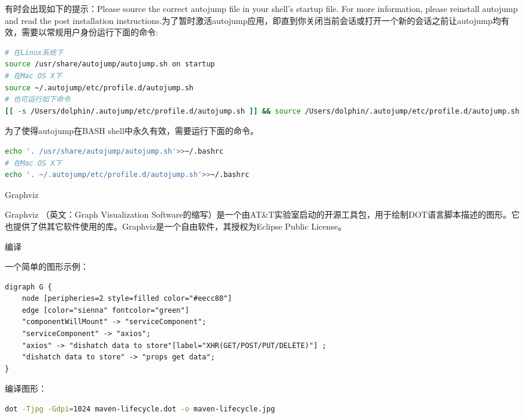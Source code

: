 \documentclass[12pt]{book}
\makeatletter
\numberwithin{dummy}{section}
\theoremstyle{ocrenumbox}
\theoremstyle{blacknumex}
\theoremstyle{blacknumbox}
\theoremstyle{ocrenum}
\renewcommand{\section}{\@startsection{section}{1}{\z@}
	{-4ex \@plus -1ex \@minus -.4ex}
	{1ex \@plus.2ex }
	{\normalfont\large\sffamily\bfseries}}
\renewcommand{\subsection}{\@startsection {subsection}{2}{\z@}
	{-3ex \@plus -0.1ex \@minus -.4ex}
	{0.5ex \@plus.2ex }
	{\normalfont\sffamily\bfseries}}
\makeatother
\begin{document}
有时会出现如下的提示：Please source the correct autojump file in your shell's startup file. For more information, please reinstall autojump and read the post installation instructions.为了暂时激活autojump应用，即直到你关闭当前会话或打开一个新的会话之前让autojump均有效，需要以常规用户身份运行下面的命令:

\begin{lstlisting}[language=Bash]
# 在Linux系统下
source /usr/share/autojump/autojump.sh on startup
# 在Mac OS X下
source ~/.autojump/etc/profile.d/autojump.sh
# 也可运行如下命令
[[ -s /Users/dolphin/.autojump/etc/profile.d/autojump.sh ]] && source /Users/dolphin/.autojump/etc/profile.d/autojump.sh
\end{lstlisting}

为了使得autojump在BASH shell中永久有效，需要运行下面的命令。

\begin{lstlisting}[language=Bash]
echo '. /usr/share/autojump/autojump.sh'>>~/.bashrc
# 在Mac OS X下
echo '. ~/.autojump/etc/profile.d/autojump.sh'>>~/.bashrc
\end{lstlisting}

\section{Graphviz}

Graphviz （英文：Graph Visualization Software的缩写）是一个由AT\&T实验室启动的开源工具包，用于绘制DOT语言脚本描述的图形。它也提供了供其它软件使用的库。Graphviz是一个自由软件，其授权为Eclipse Public License。

\subsection{编译}

一个简单的图形示例：

\begin{lstlisting}
digraph G {
	node [peripheries=2 style=filled color="#eecc80"]
	edge [color="sienna" fontcolor="green"]
	"componentWillMount" -> "serviceComponent";
	"serviceComponent" -> "axios";
	"axios" -> "dishatch data to store"[label="XHR(GET/POST/PUT/DELETE)"] ;
	"dishatch data to store" -> "props get data";
}
\end{lstlisting}

编译图形：

\begin{lstlisting}[language=Bash]
dot -Tjpg -Gdpi=1024 maven-lifecycle.dot -o maven-lifecycle.jpg
\end{lstlisting}
\end{document}
